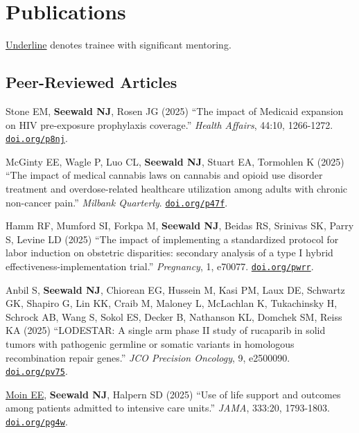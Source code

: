 \documentclass[letterpaper,11pt]{article} %
\begin{document}
	\section*{Publications}
    
    {\small \underline{Underline} denotes trainee with significant mentoring.}
    
	\subsection*{Peer-Reviewed Articles}
	
	\begin{etaremune}
        \item Stone EM, \textbf{Seewald NJ}, Rosen JG (2025) ``The impact of Medicaid expansion on HIV pre-exposure prophylaxis coverage.'' \textit{Health Affairs}, 44:10, 1266-1272. \href{https://doi.org/p8nj}{\texttt{doi.org/p8nj}}.
        
        \item McGinty EE, Wagle P, Luo CL, \textbf{Seewald NJ}, Stuart EA, Tormohlen K (2025) ``The impact of medical cannabis laws on cannabis and opioid use disorder treatment and overdose-related healthcare utilization among adults with chronic non-cancer pain.'' \textit{Milbank Quarterly}. \href{https://doi.org/p47f}{\texttt{doi.org/p47f}}.
        
        \item Hamm RF, Mumford SI, Forkpa M, \textbf{Seewald NJ}, Beidas RS, Srinivas SK, Parry S, Levine LD (2025) ``The impact of implementing a standardized protocol for labor induction on obstetric disparities: secondary analysis of a type I hybrid effectiveness-implementation trial.'' \textit{Pregnancy}, 1, e70077. \href{https://doi.org/pwrr}{\texttt{doi.org/pwrr}}.
        
        \item Anbil S, \textbf{Seewald NJ}, Chiorean EG, Hussein M, Kasi PM, Laux DE, Schwartz GK, Shapiro G, Lin KK, Craib M, Maloney L, McLachlan K, Tukachinsky H, Schrock AB, Wang S, Sokol ES, Decker B, Nathanson KL, Domchek SM, Reiss KA (2025) ``LODESTAR: A single arm phase II study of rucaparib in solid tumors with pathogenic germline or somatic variants in homologous recombination repair genes.'' \textit{JCO Precision Oncology}, 9, e2500090. \href{https://doi.org/pv75}{\texttt{doi.org/pv75}}.
    
        \item \underline{Moin EE}, \textbf{Seewald NJ}, Halpern SD (2025) ``Use of life support and outcomes among patients admitted to intensive care units.'' \textit{JAMA}, 333:20, 1793-1803. \href{https://doi.org/pg4w}{\texttt{doi.org/pg4w}}.
    

\end{etaremune}
\end{document}
